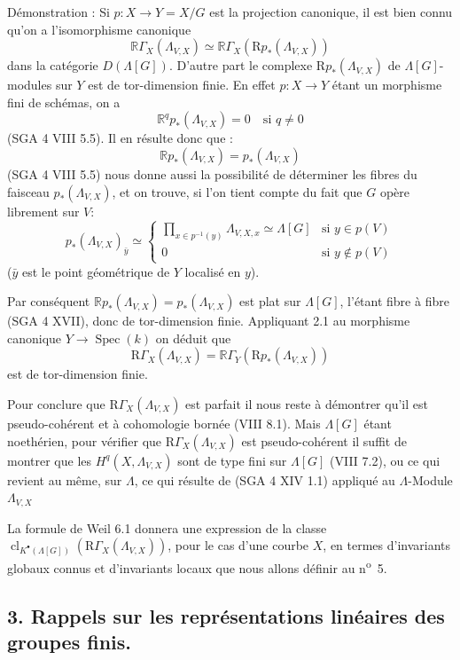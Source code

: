 \documentclass[11pt]{article}
\DeclareMathOperator{\Spec}{Spec}
\newcommand{\R}{\mathbb{R}}\newcommand{\RHomCore}{\mathbb{R}\mathrm{Hom}}
\providecommand{\R}{\mathrm R}
\providecommand{\Spec}{\operatorname{Spec}}
\providecommand{\Spec}{\operatorname{Spec}}
\providecommand{\Spec}{\operatorname{Spec}}
\providecommand{\Spec}{\operatorname{Spec}}
\begin{document}
Démonstration : Si $p:X\to Y=X/G$ est la projection canonique, il est bien connu qu'on a l'isomorphisme canonique
\[
\R\Gamma_X(\Lambda_{V,X})\simeq \R\Gamma_X(\mathrm{R}p_*(\Lambda_{V,X}))
\]
dans la catégorie $D(\Lambda[G])$. D'autre part le complexe $\mathrm{R}p_*(\Lambda_{V,X})$ de $\Lambda[G]$-modules sur $Y$ est de tor-dimension finie. En effet $p:X\to Y$ étant un morphisme fini de schémas, on a
\[
\R^q p_*(\Lambda_{V,X})=0\quad\text{si }q\ne0
\]
(SGA 4 VIII 5.5). Il en résulte donc que :
\[
\R p_*(\Lambda_{V,X})=p_*(\Lambda_{V,X})
\]
(SGA 4
VIII 5.5) nous donne aussi la possibilité de déterminer les fibres du faisceau $p_*(\Lambda_{V,X})$, et on trouve, si l'on tient compte du fait que $G$ opère librement sur $V$:
\[
p_*(\Lambda_{V,X})_{\bar y}\simeq
\begin{cases}
\displaystyle \prod_{x\in p^{-1}(y)}\Lambda_{V,X,x}\simeq \Lambda[G]& \text{si } y\in p(V)\\[1em]
0& \text{si } y\notin p(V)
\end{cases}
\]
($\bar y$ est le point géométrique de $Y$ localisé en $y$).

Par conséquent $\R p_*(\Lambda_{V,X})=p_*(\Lambda_{V,X})$ est plat sur $\Lambda[G]$, l'étant fibre à fibre (SGA 4 XVII), donc de tor-dimension finie. Appliquant 2.1 au morphisme canonique $Y\to\Spec(k)$ on déduit que
\[
\mathrm{R}\Gamma_X(\Lambda_{V,X})=\R\Gamma_Y(\mathrm{R}p_*(\Lambda_{V,X}))
\]
est de tor-dimension finie.

Pour conclure que $\mathrm{R}\Gamma_X(\Lambda_{V,X})$ est parfait il nous reste à démontrer qu'il est pseudo-cohérent et à cohomologie bornée (VIII 8.1). Mais $\Lambda[G]$ étant noethérien, pour vérifier que $\mathrm{R}\Gamma_X(\Lambda_{V,X})$ est pseudo-cohérent il suffit de montrer que les $H^q(X,\Lambda_{V,X})$ sont de type fini sur $\Lambda[G]$ (VIII 7.2), ou ce qui revient au même, sur $\Lambda$, ce qui résulte de (SGA 4 XIV 1.1) appliqué au $\Lambda$-Module $\Lambda_{V,X}$

La formule de Weil 6.1 donnera une expression de la classe $\operatorname{cl}_{K^\bullet(\Lambda[G])}(\mathrm{R}\Gamma_X(\Lambda_{V,X}))$, pour le cas d'une courbe $X$, en termes d'invariants globaux connus et d'invariants locaux que nous allons définir au n\textsuperscript{o}~5.

\subsection*{3. Rappels sur les représentations linéaires des groupes finis.}
\end{document}
